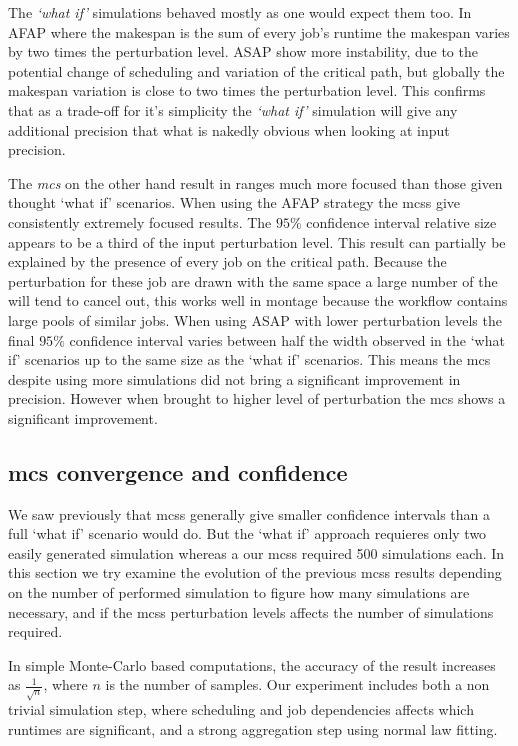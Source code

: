 \documentclass[10pt,conference,compsocconf]{IEEEtran}
\begin{document}
The \emph{`what if'} simulations behaved mostly as one would expect
them too. In AFAP where the makespan is the sum of every job's runtime the
makespan varies by two times the perturbation level. ASAP show more instability,
due to the potential change of scheduling and variation of the critical path,
but globally the makespan variation is close to two times the perturbation
level. This confirms that as a trade-off for it's simplicity the
\emph{`what if'} simulation will give any additional precision that
what is nakedly obvious when looking at input precision. 

The \emph{\acl{mcs}} on the other hand result in ranges much more focused than
those given thought `what if' scenarios. When using the AFAP strategy the
\acp{mcs} give consistently extremely focused results. The $95\%$ confidence interval
relative size appears to be a third of the input perturbation level. This result
can partially be explained by the presence of every job on the critical path.
Because the perturbation for these job are drawn with the same space a large
number of the will tend to cancel out, this works well in montage because the
workflow contains large pools of similar jobs. When using ASAP with lower
perturbation levels the final $95\%$ confidence interval varies between half the
width observed in the `what if' scenarios up to the same size as the `what if'
scenarios. This means the \ac{mcs} despite using more simulations did not bring
a significant improvement in precision. However when brought to higher level of
perturbation the \ac{mcs} shows a significant improvement.

\subsection{\acl{mcs} convergence and confidence}

We saw previously that \aclp{mcs} generally give smaller confidence intervals
than a full `what if' scenario would do. But the `what if' approach requieres
only two easily generated simulation whereas a our \acp{mcs} required 500
simulations each. In this section we try examine the evolution of the previous
\acp{mcs} results depending on the number of performed simulation to figure how
many simulations are necessary, and if the \acp{mcs} perturbation levels affects
the number of simulations required.

In simple Monte-Carlo based computations, the accuracy of the result increases
as $\frac{1}{\sqrt{n}}$, where $n$ is the number of samples\cite{Press92}.
Our experiment includes both a non trivial simulation step, where
scheduling and job dependencies affects which runtimes are significant, and a
strong aggregation step using normal law fitting. 
\end{document}
